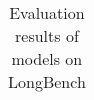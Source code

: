 \begin{table}[t]
\centering
\begin{tabular}{l}
  \toprule
  \\
  \midrule
\end{tabular}
\caption{Evaluation results of models on LongBench}
\label{tab:long_bench}
\end{table}
